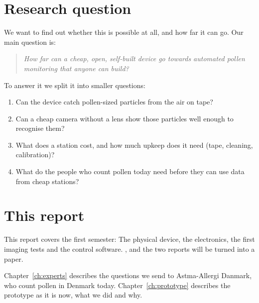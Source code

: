 \section{Research question}\label{sec:research-question}

We want to find out whether this is possible at all, and how far it can go. Our main question is:

\begin{quote}
\textit{How far can a cheap, open, self-built device go towards automated pollen monitoring
that anyone can build?}
\end{quote}

To answer it we split it into smaller questions:

\begin{enumerate}
  \item Can the device catch pollen-sized particles from the air on tape?
  \item Can a cheap camera without a lens show those particles well enough to recognise them?
  \item What does a station cost, and how much upkeep does it need (tape, cleaning, calibration)?
  \item What do the people who count pollen today need before they can use data from cheap
  stations?
\end{enumerate}

\section{This report}

This report covers the first semester: The physical
device, the electronics, the first imaging tests and the control software. , and the two reports will be turned
into a paper.

Chapter~\ref{ch:experts} describes the questions we send to Astma-Allergi Danmark, who count
pollen in Denmark today. Chapter~\ref{ch:prototype} describes the prototype as it is now, what
we did and why.
